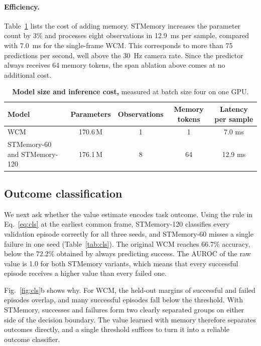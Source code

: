 \documentclass[10pt,a4paper]{article}
\begin{document}
\paragraph{Efficiency.}
Table~\ref{tab:eff} lists the cost of adding memory. STMemory increases the parameter count by 3\% and processes eight observations in 12.9~ms per sample, compared with 7.0~ms for the single-frame WCM. This corresponds to more than 75 predictions per second, well above the 30~Hz camera rate. Since the predictor always receives 64 memory tokens, the span ablation above comes at no additional cost.

\begin{table}[t]
\centering
\caption{\textbf{Model size and inference cost,} measured at batch size four on one GPU.}
\label{tab:eff}
\small
\begin{tabular}{lcccc}
\toprule
Model & Parameters & Observations & Memory tokens & Latency per sample \\
\midrule
WCM & 170.6\,M & 1 & 1 & 7.0 ms \\
STMemory-60 and STMemory-120 & 176.1\,M & 8 & 64 & 12.9 ms \\
\bottomrule
\end{tabular}
\end{table}

\subsection{Outcome classification}

We next ask whether the value estimate encodes task outcome. Using the rule in Eq.~\eqref{eq:cls} at the earliest common frame, STMemory-120 classifies every validation episode correctly for all three seeds, and STMemory-60 misses a single failure in one seed (Table~\ref{tab:cls}). The original WCM reaches 66.7\% accuracy, below the 72.2\% obtained by always predicting success. The AUROC of the raw value is 1.0 for both STMemory variants, which means that every successful episode receives a higher value than every failed one.

Fig.~\ref{fig:cls}b shows why. For WCM, the held-out margins of successful and failed episodes overlap, and many successful episodes fall below the threshold. With STMemory, successes and failures form two clearly separated groups on either side of the decision boundary. The value learned with memory therefore separates outcomes directly, and a single threshold suffices to turn it into a reliable outcome classifier.
\end{document}
